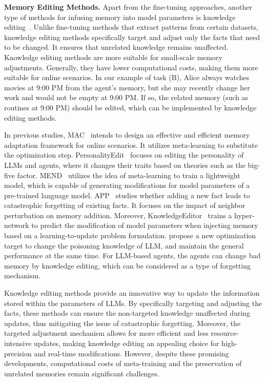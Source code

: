\documentclass{article}
\theoremstyle{definition}
\theoremstyle{theorem}
\theoremstyle{proof}
\theoremstyle{remark}
\begin{document}
	\textbf{Memory Editing Methods.}
	Apart from the fine-tuning approaches, another type of methods for infusing memory into model parameters is knowledge editing~\cite{knowledgeeditor,mend}.
	Unlike fine-tuning methods that extract patterns from certain datasets, knowledge editing methods specifically target and adjust only the facts that need to be changed. It ensures that unrelated knowledge remains unaffected. 
	Knowledge editing methods are more suitable for small-scale memory adjustments. Generally, they have lower computational costs, making them more suitable for online scenarios.
	In our example of task (B), Alice always watches movies at 9:00 PM from the agent's memory, but she may recently change her work and would not be empty at 9:00 PM. If so, the related memory (such as routines at 9:00 PM) should be edited, which can be implemented by knowledge editing methods.
	
	In previous studies, MAC~\cite{mac} intends to design an effective and efficient memory adaptation framework for online scenarios. It utilizes meta-learning to substitute the optimization step.
	PersonalityEdit~\cite{personalityedit} focuses on editing the personality of LLMs and agents, where it changes their traits based on theories such as the big-five factor.
	MEND~\cite{mend} utilizes the idea of meta-learning to train a lightweight model, which is capable of generating modifications for model parameters of a pre-trained language model.
	APP~\cite{app_paper} studies whether adding a new fact leads to catastrophic forgetting of existing facts. It focuses on the impact of neighbor perturbation on memory addition.
	Moreover, KnowledgeEditor~\cite{knowledgeeditor} trains a hyper-network to predict the modification of model parameters when injecting memory based on a learning-to-update problem formulation.
	\citet{dinm} propose a new optimization target to change the poisoning knowledge of LLM, and maintain the general performance at the same time. For LLM-based agents, the agents can change bad memory by knowledge editing, which can be considered as a type of forgetting mechanism. 
	
	Knowledge editing methods provide an innovative way to update the information stored within the parameters of LLMs. By specifically targeting and adjusting the facts, these methods can ensure the non-targeted knowledge unaffected during updates, thus mitigating the issue of catastrophic forgetting. Moreover, the targeted adjustment mechanism allows for more efficient and less resource-intensive updates, making knowledge editing an appealing choice for high-precision and real-time modifications. However, despite these promising developments, computational costs of meta-training and the preservation of unrelated memories remain significant challenges.
	
\end{document}
